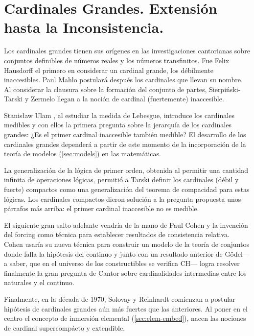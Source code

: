 \section*{Cardinales Grandes. Extensión hasta la Inconsistencia.}

Los cardinales grandes tienen sus orígenes en las investigaciones cantorianas
sobre conjuntos definibles de números reales y los números transfinitos.
Fue Felix Hausdorff \autocite{hausdorff_grundzuge_nodate} 
el primero en considerar un cardinal grande,
los débilmente inaccesibles.
Paul Mahlo \autocite{mahlo_uber_1911,mahlo_zur_1912,mahlo_zur_1913}
postulará después los cardinales que llevan su nombre.
Al considerar la clausura sobre la formación del conjunto de partes,
Sierpiński-Tarski \autocite{sierpinski_sur_1930} y  Zermelo \autocite{zermelo_uber_1930}
llegan a la noción de cardinal (fuertemente) inaccesible.

Stanisław Ulam \autocite{ulam_zur_1930}, al estudiar la medida de Lebesgue,
introduce los cardinales medibles y con ellos la primera
pregunta sobre la jerarquía de los cardinales grandes:
¿Es el primer cardinal inaccesible también medible?
El desarrollo de los cardinales grandes dependerá a partir de este
momento de la incorporación de la teoría de modelos (\cref{sec:models}) en las matemáticas.

La generalización de la lógica de primer orden, obtenida al
permitir una cantidad infinita de operaciones lógicas,
permitió a Tarski \autocite{tarski_problems_1966} definir los cardinales (débil y fuerte)
compactos como una generalización del teorema de compacidad
para estas lógicas. Los cardinales compactos dieron solución
a la pregunta propuesta unos párrafos más arriba:
el primer cardinal inaccesible no es medible.

El siguiente gran salto adelante vendría de la mano de
Paul Cohen \autocite{cohen_independence_1963,cohen_independence_1964}
y la invención del forcing como técnica
para establecer resultados de consistencia relativa.
Cohen usaría su nueva técnica para construir un modelo de la
teoría de conjuntos donde falla la hipótesis del continuo
y junto con un resultado anterior de Gödel---a saber, que
en el universo de los constructibles se verifica CH---%
logra resolver finalmente la gran pregunta de Cantor sobre cardinalidades
intermedias entre los naturales y el continuo.

Finalmente, en la década de 1970,
Solovay y Reinhardt comienzan a postular
hipótesis de cardinales grandes aún más fuertes
que las anteriores.
Al poner en el centro el concepto de inmersión elemental
(\cref{sec:elem-embed}),
nacen las nociones de cardinal supercompácto y extendible.

